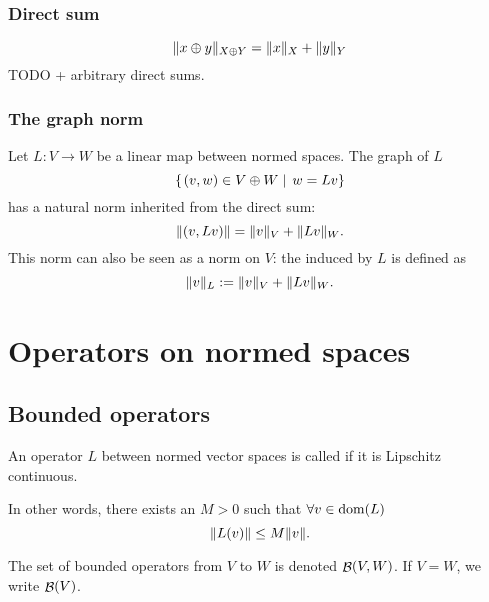 \subsubsection{Direct sum}
\[ \lVert x\oplus y\rVert_{X\oplus Y} = \lVert x\rVert_X + \lVert y\rVert_Y \]
TODO + arbitrary direct sums.
\subsubsection{The graph norm}
Let $L:V\to W$ be a linear map between normed spaces. The graph of $L$
\[ \left\{\left. (v,w)\in V\oplus W \;\right|\; w = Lv \right\} \]
has a natural norm inherited from the direct sum:
\[ \lVert(v,Lv)\rVert = \lVert v\rVert_V + \lVert Lv\rVert_W. \]
This norm can also be seen as a norm on $V$: the  induced by $L$ is defined as
\[ \lVert v\rVert_L := \lVert v\rVert_V + \lVert Lv\rVert_W. \]


\section{Operators on normed spaces}


\subsection{Bounded operators}
\begin{definition}
An operator $L$ between normed vector spaces is called  if it is Lipschitz continuous.

In other words, there exists an $M>0$ such that $\forall v\in \operatorname{dom}(L)$
\[ \lVert L(v)\rVert \leq M \lVert v\rVert. \]

The set of bounded operators from $V$ to $W$ is denoted $\mathop{\mathcal{B}}(V,W)$. If $V=W$, we write $\mathop{\mathcal{B}}(V)$.
\end{definition}

